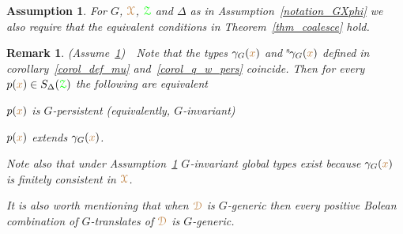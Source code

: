 \documentclass[10pt,openany]{amsproc}
\makeatletter
\newcommand{\mylabel}[1]{{\ssf{#1}}\hfill}
\renewenvironment{itemize}
  {\begin{list}{}{%
   \setlength{\parskip}{0mm}
   \setlength{\topsep}{.2\baselineskip}
   \setlength{\rightmargin}{0mm}
   \setlength{\listparindent}{0mm}
   \setlength{\itemindent}{0mm}
   \setlength{\labelwidth}{2ex}
   \setlength{\itemsep}{.1\baselineskip}
   \setlength{\parsep}{0mm}
   \setlength{\partopsep}{0mm}
   \setlength{\labelsep}{1ex}
   \setlength{\leftmargin}{\labelwidth+\labelsep}
   \let\makelabel\mylabel
   }}
   {\vspace*{-.3\baselineskip}\end{list}}
\def\proves{\vdash}
\def\IMP{\Rightarrow}
\def\D{\EuScript D}
\def\X{\EuScript X}
\def\Z{\EuScript Z}
\def\ssf#1{\textsf{\small #1}}
\newcounter{thm}
\theoremstyle{mio}
\newtheorem{fact}[thm]{Fact}\tcolorboxenvironment{fact}{mythm}
\newtheorem{assumption}[thm]{Assumption}\tcolorboxenvironment{assumption}{mythm}
\newtheorem{remark}[thm]{Remark}\tcolorboxenvironment{remark}{mythm}
\providecommand{\proofNameStyle}{\bfseries}
\renewenvironment{proof}[1][\proofname]{\par
  \pushQED{\qed}%
  \normalfont%
  \trivlist
  \item[\hskip\labelsep
        \proofNameStyle
    #1\@addpunct{.}]\ignorespaces
}{%
  \popQED\endtrivlist\@endpefalse
}
\def\mr{\color{brown}}
\def\gr{\color{green}}
\def\mrD{{\mr\D}}
\def\mrX{{\mr\X}}
\def\grZ{{\gr\Z}}
\makeatother
\begin{document}
\begin{assumption}\label{notation_2}
  For $G$, $\mrX$, $\grZ$ and $\Delta$ as in Assumption~\ref{notation_GXphi} we also require that the equivalent conditions in Theorem~\ref{thm_coalesce} hold.
\end{assumption}

\begin{remark}\label{rem_coalesce}
  (Assume~\ref{notation_2})\ \ 
  Note that the types $\gamma_G({\mr x})$ and  ${}^{\rm s}\kern-.2ex\gamma_G({\mr x})$ defined in corollary~\ref{corol_def_mu} and~\ref{corol_q_w_pers} coincide.
  Then for every $p({\mr x})\in S_\Delta(\grZ)$ the following are equivalent
  \begin{itemize}
    \item[1.] $p({\mr x})$ is $G$-persistent (equivalently, $G$-invariant)
    \item[2.] $p({\mr x})$ extends $\gamma_G({\mr x})$.
  \end{itemize}
  Note also that under Assumption~\ref{notation_2} $G$-invariant global types exist because $\gamma_G({\mr x})$ is finitely consistent in $\mrX$.

  It is also worth mentioning that when $\mrD$ is $G$-generic then every positive Bolean combination of $G$-translates of $\mrD$ is $G$-generic.
\end{remark}



\end{document}
